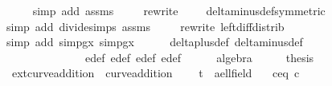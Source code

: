 \begin{isabellebody}
\ \ \ \ \isamarkupfalse%
{\isacharparenleft}simp\ add{\isacharcolon}\ assms{\isacharparenleft}{}{\isacharcomma}{}{\isacharparenright}{\isacharparenright}\isanewline
\ \ \ \ \isamarkupfalse%
{\isacharparenleft}rewrite\ \ {\isachardoublequoteopen}{\isacharunderscore}\ {\isacharslash}\ {\isasymhole}{\isachardoublequoteclose}\ delta{\isacharunderscore}minus{\isacharunderscore}def{\isacharbrackleft}symmetric{\isacharbrackright}{\isacharparenright}{\isacharplus}\isanewline
\ \ \ \ \isamarkupfalse%
{\isacharparenleft}simp\ add{\isacharcolon}\ divide{\isacharunderscore}simps\ assms{\isacharparenleft}{}{\isacharcomma}{}{}{\isacharparenright}{\isacharparenright}\isanewline
\ \ \ \ \isamarkupfalse%
{\isacharparenleft}rewrite\ left{\isacharunderscore}diff{\isacharunderscore}distrib{\isacharparenright}\isanewline
\ \ \ \ \isamarkupfalse%
{\isacharparenleft}simp\ add{\isacharcolon}\ simp{}gx\ simp{}gx{\isacharparenright}\isanewline
\ \ \ \ \isamarkupfalse%
\ delta{\isacharunderscore}plus{\isacharunderscore}def\ delta{\isacharunderscore}minus{\isacharunderscore}def\isanewline
\ \ \ \ \ \ \ \ \ \ \ \ \ \ e{}{\isacharunderscore}def\ e{}{\isacharunderscore}def\ e{}{\isacharunderscore}def\ e{\isacharunderscore}def\isanewline
\ \ \ \ \isamarkupfalse%
\ algebra\isanewline
\isanewline
\ \ \isamarkupfalse%
\ \isamarkupfalse%
\ {\isacharquery}thesis\isanewline
\ \ \ \ \isamarkupfalse%
\isanewline
\isanewline
{}\isamarkupfalse%
%
\endisatagproof
{\isafoldproof}%
%
\isadelimproof
\isanewline
%
\endisadelimproof
\isanewline
{}\isamarkupfalse%
%
\isadelimdocument
%
\endisadelimdocument
%
\isatagdocument
%
\isamarkuptrue%
%
\endisatagdocument
{\isafolddocument}%
%
\isadelimdocument
%
\endisadelimdocument
{}\isamarkupfalse%
\ ext{\isacharunderscore}curve{\isacharunderscore}addition\ {\isacharequal}\ curve{\isacharunderscore}addition\ {\isacharplus}\isanewline
\ \ \ t{\isacharprime}\ {\isacharcolon}{\isacharcolon}\ {\isachardoublequoteopen}{\isacharprime}a{\isacharcolon}{\isacharcolon}ell{\isacharunderscore}field{\isachardoublequoteclose}\isanewline
\ \ \ c{\isacharunderscore}eq{\isacharunderscore}{}{\isacharcolon}\ {\isachardoublequoteopen}c\ {\isacharequal}\ {}{\isachardoublequoteclose}\isanewline

\end{isabellebody}
